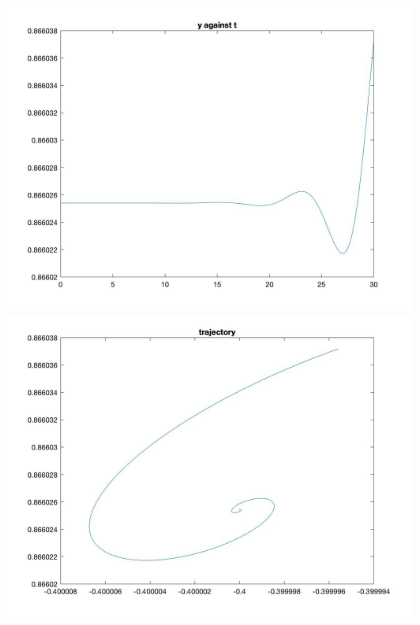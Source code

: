 \documentclass[11pt]{article}
\begin{document}
\begin{figure}[H]
\includegraphics[width = 12cm, height = 8cm]{Q5(11).jpg}
\includegraphics[width = 12cm, height = 8cm]{Q5(12).jpg}
\end{figure}
\end{document}
